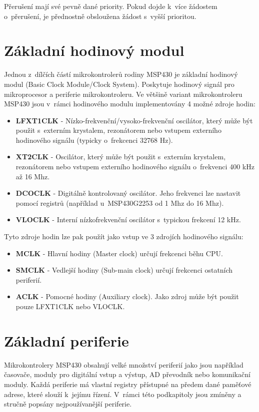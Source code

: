 Přerušení mají své pevně dané priority. Pokud dojde k~více žádostem o~přerušení, je přednostně obsloužena žádost s~vyšší prioritou.

\section{Základní hodinový modul}

Jednou z~dílčích částí mikrokontrolerů rodiny MSP430 je základní hodinový modul (Basic Clock Module/Clock System). Poskytuje hodinový signál pro mikroprocesor a periferie mikrokontroleru. Ve většině variant mikrokontroleru MSP430 jsou v~rámci hodinového modulu implementovány 4 možné zdroje hodin:

\begin{itemize}
\item \textbf{LFXT1CLK} - Nízko-frekvenční/vysoko-frekvenční oscilátor, který může být použit s~externím krystalem, rezonátorem nebo vstupem externího hodinového signálu (typicky o~frekcenci 32768 Hz).
\item \textbf{XT2CLK} - Oscilátor, který může být použit s~externím krystalem, rezonátorem nebo vstupem externího hodinového signálu o~frekvenci 400 kHz až 16 Mhz.
\item \textbf{DCOCLK} - Digitálně kontrolovaný oscilátor. Jeho frekvenci lze nastavit pomocí registrů (například u~MSP430G2253 od 1 Mhz do 16 Mhz).
\item \textbf{VLOCLK} - Interní nízkofrekvenční oscilátor s~typickou frekcení 12 kHz.
\end{itemize}

Tyto zdroje hodin lze pak použít jako vstup ve 3 zdrojích hodinového signálu:

\begin{itemize}
\item \textbf{MCLK} - Hlavní hodiny (Master clock) určují frekcenci běhu CPU.
\item \textbf{SMCLK} - Vedlejší hodiny (Sub-main clock) určují frekcenci ostatních periferií.
\item \textbf{ACLK} - Pomocné hodiny (Auxiliary clock). Jako zdroj může být použit pouze LFXT1CLK nebo VLOCLK.
\end{itemize}

\section{Základní periferie}

Mikrokontrolery MSP430 obsahují velké množství periferií jako jsou například časovače, moduly pro digitální vstup a výstup, AD převodník nebo komunikační moduly. Každá periferie má vlastní registry přístupné na předem dané paměťové adrese, které slouží k~jejímu řízení. V~rámci této podkapitoly jsou zmíněny a stručně popsány nejpoužívanější periferie.

